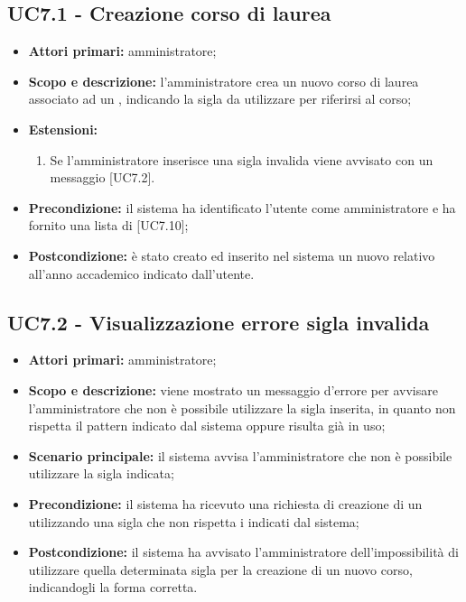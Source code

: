 \documentclass[AnalisiDeiRequisiti.tex]{subfiles}
\begin{document}
\subsection{UC7.1 - Creazione corso di laurea}
\begin{itemize}
	\item \textbf{Attori primari:} amministratore;
	\item \textbf{Scopo e descrizione:} l'amministratore crea un nuovo corso di laurea associato ad un , indicando la sigla da utilizzare per riferirsi al corso;
	\item \textbf{Estensioni:}
		\begin{enumerate}
			\item Se l'amministratore inserisce una sigla invalida viene avvisato con un messaggio [UC7.2].
		\end{enumerate}
	\item \textbf{Precondizione:} il sistema ha identificato l'utente come amministratore e ha fornito una lista di  [UC7.10];
	\item \textbf{Postcondizione:} è stato creato ed inserito nel sistema un nuovo  relativo all'anno accademico indicato dall'utente.
\end{itemize}


\subsection{UC7.2 - Visualizzazione errore sigla invalida}
\begin{itemize}
	\item \textbf{Attori primari:} amministratore;
	\item \textbf{Scopo e descrizione:} viene mostrato un messaggio d'errore per avvisare l'amministratore che non è possibile utilizzare la sigla inserita, in quanto non rispetta il pattern indicato dal sistema oppure risulta già in uso;
	\item \textbf{Scenario principale:} il sistema avvisa l'amministratore che non è possibile utilizzare la sigla indicata;
	\item \textbf{Precondizione:} il sistema ha ricevuto una richiesta di creazione di un  utilizzando una sigla che non rispetta i  indicati dal sistema; 
	\item \textbf{Postcondizione:} il sistema ha avvisato l'amministratore dell'impossibilità di utilizzare quella determinata sigla per la creazione di un nuovo corso, indicandogli la forma corretta.
\end{itemize}
\end{document}
